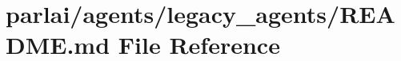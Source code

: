 \hypertarget{parlai_2agents_2legacy__agents_2README_8md}{}\section{parlai/agents/legacy\+\_\+agents/\+R\+E\+A\+D\+ME.md File Reference}
\label{parlai_2agents_2legacy__agents_2README_8md}
